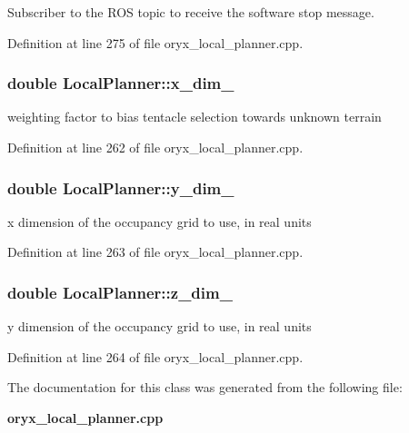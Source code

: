 \-Subscriber to the \-R\-O\-S topic to receive the software stop message. 



\-Definition at line 275 of file oryx\-\_\-local\-\_\-planner.\-cpp.

\subsubsection[{x\-\_\-dim\-\_\-}]{\setlength{\rightskip}{0pt plus 5cm}double {\bf \-Local\-Planner\-::x\-\_\-dim\-\_\-}\hspace{0.3cm}{\ttfamily  [private]}}\label{classLocalPlanner_a8341d0c7a16284070852ae4b31d83929}


weighting factor to bias tentacle selection towards unknown terrain 



\-Definition at line 262 of file oryx\-\_\-local\-\_\-planner.\-cpp.

\subsubsection[{y\-\_\-dim\-\_\-}]{\setlength{\rightskip}{0pt plus 5cm}double {\bf \-Local\-Planner\-::y\-\_\-dim\-\_\-}\hspace{0.3cm}{\ttfamily  [private]}}\label{classLocalPlanner_abc0f1d506fc102fdc2802f55b654b613}


x dimension of the occupancy grid to use, in real units 



\-Definition at line 263 of file oryx\-\_\-local\-\_\-planner.\-cpp.

\subsubsection[{z\-\_\-dim\-\_\-}]{\setlength{\rightskip}{0pt plus 5cm}double {\bf \-Local\-Planner\-::z\-\_\-dim\-\_\-}\hspace{0.3cm}{\ttfamily  [private]}}\label{classLocalPlanner_a5a5e8a299d488da417fa3baea4b9b785}


y dimension of the occupancy grid to use, in real units 



\-Definition at line 264 of file oryx\-\_\-local\-\_\-planner.\-cpp.



\-The documentation for this class was generated from the following file\-:\begin{DoxyCompactItemize}
\item 
{\bf oryx\-\_\-local\-\_\-planner.\-cpp}\end{DoxyCompactItemize}
